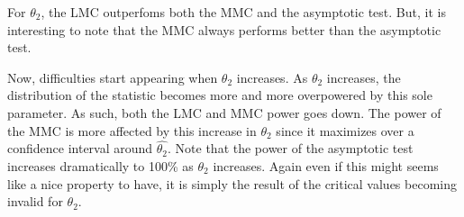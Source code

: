 \documentclass[]{article}\usepackage[]{graphicx}\usepackage[]{color}
\begin{document}
\begin{table}[H]
	\centering
	\caption{Empirical levels for 250 replications of the Wald statistic where $\alpha = 5\%$, $\theta_1=1$, testing $H_0: \left[ \theta_1\theta_2^2, \theta_1^2\right] =0$ against $H_1: \left[ \theta_1\theta_2^2, \theta_1^2\right] \neq 0$}
	\label{tbl:W:12}
\end{table}


For $\theta_2$, the LMC outperfoms both the MMC and the asymptotic test. But, it is interesting to note that the MMC always performs better than the asymptotic test.

Now, difficulties start appearing when $\theta_2$ increases. As $\theta_2$ increases, the distribution of the statistic becomes more and more overpowered by this sole parameter. As such, both the LMC and MMC power goes down. The power of the MMC is more affected by this increase in $\theta_2$ since it maximizes over a confidence interval around $\hat{\theta_2}$. Note that the power of the asymptotic test increases dramatically to 100\% as $\theta_2$ increases. Again even if this might seems like a nice property to have, it is simply the result of the critical values becoming invalid for $\theta_2$.
\end{document}
